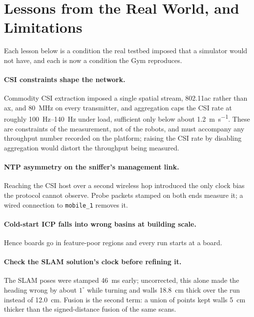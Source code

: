 \section{Lessons from the Real World, and Limitations}
\label{sec:lessons}
Each lesson below is a condition the real testbed imposed that a
simulator would not have, and each is now a condition the Gym
reproduces.

\paragraph{CSI constraints shape the network.} Commodity CSI extraction
imposed a single spatial stream, 802.11ac rather than ax, and
\SI{80}{\mega\hertz} on every transmitter, and aggregation caps the
CSI rate at roughly \SIrange{100}{140}{\hertz} under load, sufficient
only below about \SI{1.2}{\metre\per\second}. These are constraints of
the measurement, not of the robots, and must accompany any throughput
number recorded on the platform; raising the CSI rate by disabling
aggregation would distort the throughput being measured.

\paragraph{NTP asymmetry on the sniffer's management link.} Reaching
the CSI host over a second wireless hop introduced the only clock bias
the protocol cannot observe. Probe packets stamped on both ends
measure it; a wired connection to \texttt{mobile\_1} removes it.

\paragraph{Cold-start ICP falls into wrong basins at building scale.}
Hence boards go in feature-poor regions and every run starts at a
board.

\paragraph{Check the SLAM solution's clock before refining it.} The
SLAM poses were stamped \SI{46}{\milli\second} early; uncorrected,
this alone made the heading wrong by about $1^\circ$ while turning and
walls \SI{18.8}{\centi\metre} thick over the run instead of
\SI{12.0}{\centi\metre}. Fusion is the second
term: a union of points kept walls \SI{5}{\centi\metre} thicker than
the signed-distance fusion of the same scans.

